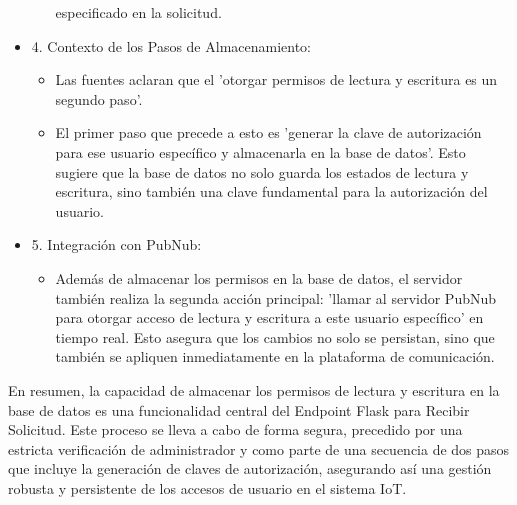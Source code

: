 \documentclass{report}
\begin{document}
\begin{itemize}
\begin{itemize}
            especificado en la solicitud.
        \end{itemize}
    \item 4. Contexto de los Pasos de Almacenamiento:
        \begin{itemize}
            \item Las fuentes aclaran que el 'otorgar permisos de lectura y escritura es un segundo paso'.
            \item El primer paso que precede a esto es 'generar la clave de autorización para ese usuario específico y almacenarla en la 
            base de datos'. Esto sugiere que la base de datos no solo guarda los estados de lectura y escritura, sino también una clave 
            fundamental para la autorización del usuario.
        \end{itemize}
    \item 5. Integración con PubNub:
        \begin{itemize}
            \item Además de almacenar los permisos en la base de datos, el servidor también realiza la segunda acción principal: 
            'llamar al servidor PubNub para otorgar acceso de lectura y escritura a este usuario específico' en tiempo real. 
            Esto asegura que los cambios no solo se persistan, sino que también se apliquen inmediatamente en la plataforma de comunicación.
        \end{itemize}
\end{itemize}
En resumen, la capacidad de almacenar los permisos de lectura y escritura en la base de datos es una funcionalidad central del Endpoint 
Flask para Recibir Solicitud. Este proceso se lleva a cabo de forma segura, precedido por una estricta verificación de administrador y 
como parte de una secuencia de dos pasos que incluye la generación de claves de autorización, asegurando así una gestión robusta y persistente 
de los accesos de usuario en el sistema IoT.
\end{document}
